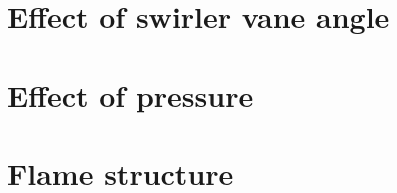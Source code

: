 \section{Effect of swirler vane angle}

\section{Effect of pressure}

\section{Flame structure}




